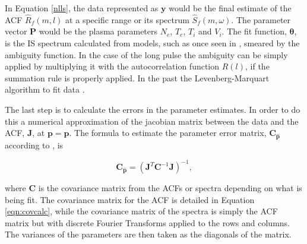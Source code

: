 In Equation \ref{nlls}, the data represented as $\mathbf{y}$ would be the final estimate of the ACF $\widehat{R}_f(m,l)$ at a specific range or its spectrum $\widehat{S}_f(m,\omega)$. The parameter vector $\mathbf{P}$ would be the plasma parameters $N_e$, $T_e$, $T_i$ and $V_i$. The fit function, $\bm{\theta}$, is the IS spectrum calculated from models, such as once seen in \cite{kudeki:milla:1}, smeared by the ambiguity function. In the case of the long pulse the ambiguity can be simply applied by multiplying it with the autocorrelation function $R(l)$, if the summation rule is properly applied. In the past the Levenberg-Marquart algorithm to fit data \cite{nikoukar2008}.


The last step is to calculate the errors in the parameter estimates. In order to do this a numerical approximation of the jacobian matrix between the data and the ACF, $\mathbf{J}$, at $\mathbf{p}=\mathbf{\hat{p}}$. The formula to estimate the parameter error matrix, $\mathbf{C}_{\mathbf{\hat{p}}}$ according to \cite{Hysell:2000cq}, is


\begin{equation}
\label{eqn:jacinv}
\mathbf{C}_{\mathbf{\hat{p}}}=(\mathbf{J}^T \mathbf{C}^{-1}\mathbf{J})^{-1},
\end{equation}

\noindent where $ \mathbf{C}$ is the covariance matrix from the ACFs or spectra depending on what is being fit. The covariance matrix for the ACF is detailed in Equation \ref{eqn:covcalc}, while the covariance matrix of the spectra is simply the ACF matrix but with discrete Fourier Transforms applied to the rows and columns. The variances of the parameters are then taken as the diagonals of the matrix.


